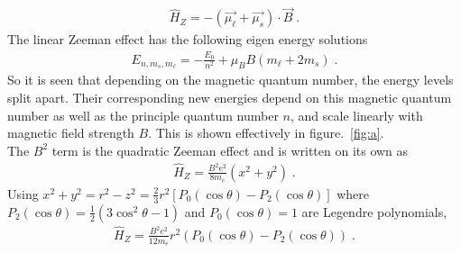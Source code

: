        \begin{align}
            \hat{H}_Z = - \left(\vec{\mu_\ell} + \vec{\mu_s} \right) \cdot \vec{B}\;.
        \end{align}
        \noindent The linear Zeeman effect has the following eigen energy solutions 
        \begin{align}
            E_{n, m_s, m_\ell} = - \frac{E_0}{n^2} + \mu_B B(m_\ell + 2m_s)\;.
        \end{align}
        \noindent So it is seen that depending on the magnetic quantum number, the energy levels split apart. Their corresponding new energies depend on this magnetic quantum number as well as the principle quantum number $n$, and scale linearly with magnetic field strength $B$. This is shown effectively in figure.~\ref{fig:a}.\\

        \noindent The $B^2$ term is the quadratic Zeeman effect and is written on its own as
        \begin{align}
            \hat{H}_Z = \frac{B^2e^2}{8m_e} (x^2 + y^2)\;.
        \end{align}
        \noindent Using $x^2 + y^2 = r^2 - z^2 = \frac{2}{3}r^2\left[ P_0(\cos \theta) - P_2(\cos \theta)\right]$ where $P_2(\cos \theta) = \frac{1}{2}\left(3\cos^2\theta - 1\right)$ and $P_0(\cos \theta) = 1$ are Legendre polynomials,
        \begin{align}
            \hat{H}_Z = \frac{B^2e^2}{12m_e}r^2 (P_0(\cos \theta) - P_2(\cos \theta))\;.
        \end{align}


